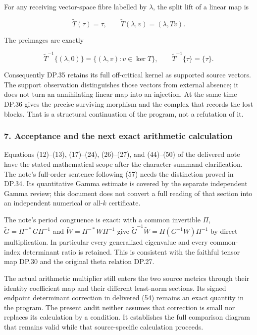 For any receiving vector-space fibre labelled by \(\lambda\), the split lift of a linear map is

\[
\widetilde T(\tau)=\tau,
\qquad \widetilde T(\lambda,v)=(\lambda,Tv).
\tag{DP.37}
\]

The preimages are exactly

\[
\widetilde T^{-1}\{(\lambda,0)\}
=\{(\lambda,v):v\in\ker T\},
\qquad \widetilde T^{-1}\{\tau\}=\{\tau\}.
\tag{DP.38}
\]

Consequently DP.35 retains its full off-critical kernel as supported source vectors. The support observation distinguishes those vectors from external absence; it does not turn an annihilating linear map into an injection. At the same time DP.36 gives the precise surviving morphism and the complex that records the lost blocks. That is a structural continuation of the program, not a refutation of it.

\subsubsection{7. Acceptance and the next exact arithmetic calculation}\label{endpoint-purity_review--acceptance-and-the-next-exact-arithmetic-calculation}

Equations (12)--(13), (17)--(24), (26)--(27), and (44)--(50) of the delivered note have the stated mathematical scope after the character-summand clarification. The note's full-order sentence following (57) needs the distinction proved in DP.34. Its quantitative Gamma estimate is covered by the separate independent Gamma review; this document does not convert a full reading of that section into an independent numerical or all-\(k\) certificate.

The note's period congruence is exact: with a common invertible \(\Pi\), \(\widetilde G=\Pi^{-*}G\Pi^{-1}\) and \(\widetilde W=\Pi^{-*}W\Pi^{-1}\) give \(\widetilde G^{-1}\widetilde W=\Pi(G^{-1}W)\Pi^{-1}\) by direct multiplication. In particular every generalized eigenvalue and every common-index determinant ratio is retained. This is consistent with the faithful tensor map DP.30 and the original theta relation DP.27.

The actual arithmetic multiplier still enters the two source metrics through their identity coefficient map and their different least-norm sections. Its signed endpoint determinant correction in delivered (54) remains an exact quantity in the program. The present audit neither assumes that correction is small nor replaces its calculation by a condition. It establishes the full comparison diagram that remains valid while that source-specific calculation proceeds.

